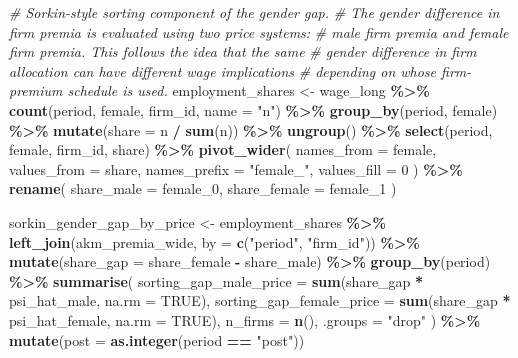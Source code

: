 \documentclass[
]{article}
\newenvironment{Shaded}{\begin{snugshade}}{\end{snugshade}}
\newcommand{\AttributeTok}[1]{\textcolor[rgb]{0.13,0.29,0.53}{#1}}
\newcommand{\CommentTok}[1]{\textcolor[rgb]{0.56,0.35,0.01}{\textit{#1}}}
\newcommand{\ConstantTok}[1]{\textcolor[rgb]{0.56,0.35,0.01}{#1}}
\newcommand{\DecValTok}[1]{\textcolor[rgb]{0.00,0.00,0.81}{#1}}
\newcommand{\FunctionTok}[1]{\textcolor[rgb]{0.13,0.29,0.53}{\textbf{#1}}}
\newcommand{\NormalTok}[1]{#1}
\newcommand{\OtherTok}[1]{\textcolor[rgb]{0.56,0.35,0.01}{#1}}
\newcommand{\SpecialCharTok}[1]{\textcolor[rgb]{0.81,0.36,0.00}{\textbf{#1}}}
\newcommand{\StringTok}[1]{\textcolor[rgb]{0.31,0.60,0.02}{#1}}
\begin{document}
\begin{Shaded}
\begin{Highlighting}[]
\CommentTok{\# Sorkin{-}style sorting component of the gender gap.}
\CommentTok{\# The gender difference in firm premia is evaluated using two price systems:}
\CommentTok{\# male firm premia and female firm premia. This follows the idea that the same}
\CommentTok{\# gender difference in firm allocation can have different wage implications}
\CommentTok{\# depending on whose firm{-}premium schedule is used.}
\NormalTok{employment\_shares }\OtherTok{\textless{}{-}}\NormalTok{ wage\_long }\SpecialCharTok{\%\textgreater{}\%}
    \FunctionTok{count}\NormalTok{(period, female, firm\_id, }\AttributeTok{name =} \StringTok{"n"}\NormalTok{) }\SpecialCharTok{\%\textgreater{}\%}
    \FunctionTok{group\_by}\NormalTok{(period, female) }\SpecialCharTok{\%\textgreater{}\%}
    \FunctionTok{mutate}\NormalTok{(}\AttributeTok{share =}\NormalTok{ n }\SpecialCharTok{/} \FunctionTok{sum}\NormalTok{(n)) }\SpecialCharTok{\%\textgreater{}\%}
    \FunctionTok{ungroup}\NormalTok{() }\SpecialCharTok{\%\textgreater{}\%}
    \FunctionTok{select}\NormalTok{(period, female, firm\_id, share) }\SpecialCharTok{\%\textgreater{}\%}
    \FunctionTok{pivot\_wider}\NormalTok{(}
        \AttributeTok{names\_from =}\NormalTok{ female,}
        \AttributeTok{values\_from =}\NormalTok{ share,}
        \AttributeTok{names\_prefix =} \StringTok{"female\_"}\NormalTok{,}
        \AttributeTok{values\_fill =} \DecValTok{0}
\NormalTok{    ) }\SpecialCharTok{\%\textgreater{}\%}
    \FunctionTok{rename}\NormalTok{(}
        \AttributeTok{share\_male =}\NormalTok{ female\_0,}
        \AttributeTok{share\_female =}\NormalTok{ female\_1}
\NormalTok{    )}

\NormalTok{sorkin\_gender\_gap\_by\_price }\OtherTok{\textless{}{-}}\NormalTok{ employment\_shares }\SpecialCharTok{\%\textgreater{}\%}
    \FunctionTok{left\_join}\NormalTok{(akm\_premia\_wide, }\AttributeTok{by =} \FunctionTok{c}\NormalTok{(}\StringTok{"period"}\NormalTok{, }\StringTok{"firm\_id"}\NormalTok{)) }\SpecialCharTok{\%\textgreater{}\%}
    \FunctionTok{mutate}\NormalTok{(}\AttributeTok{share\_gap =}\NormalTok{ share\_female }\SpecialCharTok{{-}}\NormalTok{ share\_male) }\SpecialCharTok{\%\textgreater{}\%}
    \FunctionTok{group\_by}\NormalTok{(period) }\SpecialCharTok{\%\textgreater{}\%}
    \FunctionTok{summarise}\NormalTok{(}
        \AttributeTok{sorting\_gap\_male\_price =} \FunctionTok{sum}\NormalTok{(share\_gap }\SpecialCharTok{*}\NormalTok{ psi\_hat\_male, }\AttributeTok{na.rm =} \ConstantTok{TRUE}\NormalTok{),}
        \AttributeTok{sorting\_gap\_female\_price =} \FunctionTok{sum}\NormalTok{(share\_gap }\SpecialCharTok{*}\NormalTok{ psi\_hat\_female, }\AttributeTok{na.rm =} \ConstantTok{TRUE}\NormalTok{),}
        \AttributeTok{n\_firms =} \FunctionTok{n}\NormalTok{(),}
        \AttributeTok{.groups =} \StringTok{"drop"}
\NormalTok{    ) }\SpecialCharTok{\%\textgreater{}\%}
    \FunctionTok{mutate}\NormalTok{(}\AttributeTok{post =} \FunctionTok{as.integer}\NormalTok{(period }\SpecialCharTok{==} \StringTok{"post"}\NormalTok{))}


\end{Highlighting}
\end{Shaded}
\end{document}
